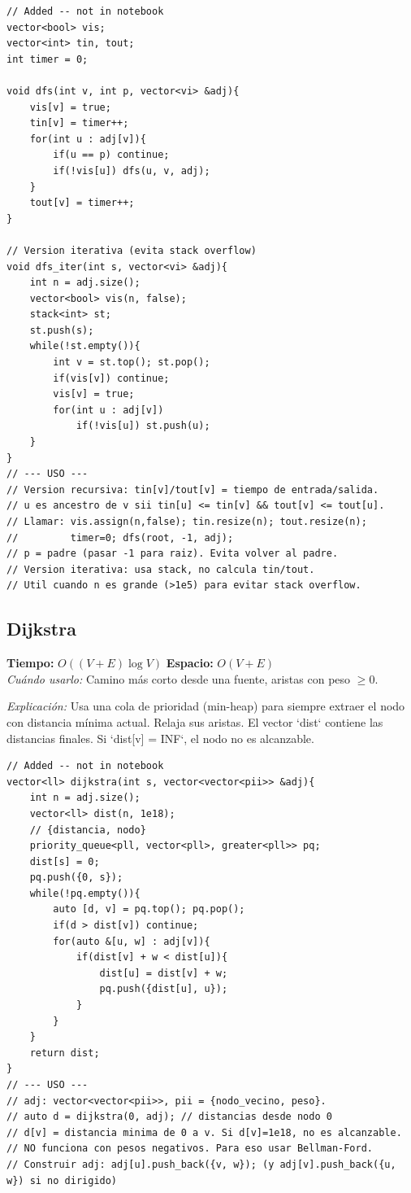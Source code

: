 \documentclass[10pt,a4paper]{article}
\begin{document}
\begin{multicols}{2}
\begin{lstlisting}
// Added -- not in notebook
vector<bool> vis;
vector<int> tin, tout;
int timer = 0;

void dfs(int v, int p, vector<vi> &adj){
    vis[v] = true;
    tin[v] = timer++;
    for(int u : adj[v]){
        if(u == p) continue;
        if(!vis[u]) dfs(u, v, adj);
    }
    tout[v] = timer++;
}

// Version iterativa (evita stack overflow)
void dfs_iter(int s, vector<vi> &adj){
    int n = adj.size();
    vector<bool> vis(n, false);
    stack<int> st;
    st.push(s);
    while(!st.empty()){
        int v = st.top(); st.pop();
        if(vis[v]) continue;
        vis[v] = true;
        for(int u : adj[v])
            if(!vis[u]) st.push(u);
    }
}
// --- USO ---
// Version recursiva: tin[v]/tout[v] = tiempo de entrada/salida.
// u es ancestro de v sii tin[u] <= tin[v] && tout[v] <= tout[u].
// Llamar: vis.assign(n,false); tin.resize(n); tout.resize(n);
//         timer=0; dfs(root, -1, adj);
// p = padre (pasar -1 para raiz). Evita volver al padre.
// Version iterativa: usa stack, no calcula tin/tout.
// Util cuando n es grande (>1e5) para evitar stack overflow.
\end{lstlisting}

\subsection{Dijkstra}
\textbf{Tiempo:} $O((V + E) \log V)$ \quad \textbf{Espacio:} $O(V + E)$\\
\textit{Cu\'ando usarlo:} Camino m\'as corto desde una fuente, aristas con peso $\geq 0$.

\textit{Explicación:} Usa una cola de prioridad (min-heap) para siempre extraer el nodo con distancia mínima actual. Relaja sus aristas. El vector `dist` contiene las distancias finales. Si `dist[v] = INF`, el nodo no es alcanzable.

\begin{lstlisting}
// Added -- not in notebook
vector<ll> dijkstra(int s, vector<vector<pii>> &adj){
    int n = adj.size();
    vector<ll> dist(n, 1e18);
    // {distancia, nodo}
    priority_queue<pll, vector<pll>, greater<pll>> pq;
    dist[s] = 0;
    pq.push({0, s});
    while(!pq.empty()){
        auto [d, v] = pq.top(); pq.pop();
        if(d > dist[v]) continue;
        for(auto &[u, w] : adj[v]){
            if(dist[v] + w < dist[u]){
                dist[u] = dist[v] + w;
                pq.push({dist[u], u});
            }
        }
    }
    return dist;
}
// --- USO ---
// adj: vector<vector<pii>>, pii = {nodo_vecino, peso}.
// auto d = dijkstra(0, adj); // distancias desde nodo 0
// d[v] = distancia minima de 0 a v. Si d[v]=1e18, no es alcanzable.
// NO funciona con pesos negativos. Para eso usar Bellman-Ford.
// Construir adj: adj[u].push_back({v, w}); (y adj[v].push_back({u, w}) si no dirigido)
\end{lstlisting}


\end{multicols}
\end{document}
